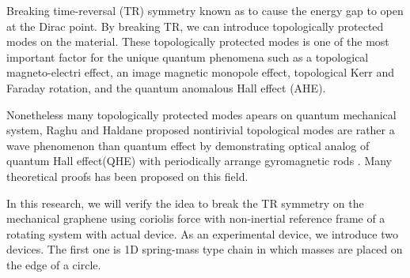 \documentclass[../main.tex]{subfiles}
\begin{document}
Breaking time-reversal (TR) symmetry known as to cause the energy gap to open
at the Dirac point\cite{lee}. 
By breaking TR, we can introduce topologically protected modes on the material.
These topologically protected modes is one of the most important factor for the unique quantum
phenomena such as a topological magneto-electri effect, an image
magnetic monopole effect, topological Kerr and Faraday rotation, and the
quantum anomalous Hall effect (AHE)\cite{lee}.

Nonetheless many topologically protected modes apears on quantum mechanical
system, Raghu and Haldane proposed nontirivial topological modes are
rather a wave phenomenon than quantum effect by demonstrating
optical analog of quantum Hall effect(QHE) with periodically arrange gyromagnetic rods
\cite{raghu,haldane}.
Many theoretical proofs has been proposed on this field\cite{haldane,wang2,xianyu}.

In this research, we will verify the idea to break the TR symmetry on the
mechanical graphene using coriolis force with non-inertial reference frame of
a rotating system with actual device\cite{kariyado,wang}.
As an experimental device, we introduce two devices. The first one is 1D spring-mass type
chain in which masses are placed on the edge of a circle.
\end{document}
